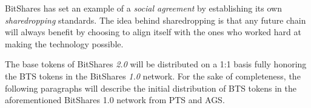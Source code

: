 BitShares has set an example of a \emph{social agreement} by establishing its
own \emph{sharedropping} standards. The idea behind sharedropping is that any
future chain will always benefit by choosing to align itself with the ones who
worked hard at making the technology possible.

The base tokens of BitShares \emph{2.0} will be distributed on a 1:1 basis
fully honoring the BTS tokens in the BitShares \emph{1.0} network. For the sake
of completeness, the following paragraphs will describe the initial
distribution of BTS tokens in the aforementioned BitShares 1.0 network from PTS
and AGS.
